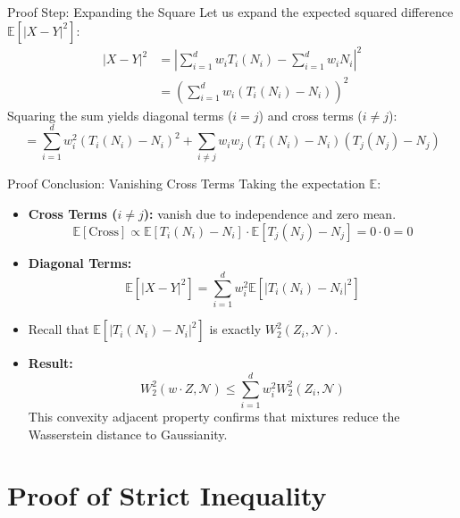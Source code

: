 \documentclass{beamer}
\begin{document}
\begin{frame}{Proof Step: Expanding the Square}
  Let us expand the expected squared difference $\mathbb{E}[|X - Y|^2]$:
  \begin{align*}
    |X - Y|^2 &= \left| \sum_{i=1}^d w_i T_i(N_i) - \sum_{i=1}^d w_i N_i \right|^2 \\
              &= \left( \sum_{i=1}^d w_i (T_i(N_i) - N_i) \right)^2
  \end{align*}
  Squaring the sum yields diagonal terms ($i=j$) and cross terms ($i \neq j$):
  \[
    = \sum_{i=1}^d w_i^2 (T_i(N_i) - N_i)^2 + \sum_{i \neq j} w_i w_j (T_i(N_i) - N_i)(T_j(N_j) - N_j)
  \]
\end{frame}

\begin{frame}{Proof Conclusion: Vanishing Cross Terms}
  Taking the expectation $\mathbb{E}$:
  \begin{itemize}
    \item \textbf{Cross Terms ($i \neq j$):} vanish due to independence and zero mean.
      \[
        \mathbb{E}[\text{Cross}] \propto \mathbb{E}[T_i(N_i) - N_i] \cdot \mathbb{E}[T_j(N_j) - N_j] = 0 \cdot 0 = 0
      \]
    \item \textbf{Diagonal Terms:}
      \[
        \mathbb{E}[|X - Y|^2] = \sum_{i=1}^d w_i^2 \mathbb{E}[ |T_i(N_i) - N_i|^2 ]
      \]
    \item Recall that $\mathbb{E}[ |T_i(N_i) - N_i|^2 ]$ is exactly $W_2^2(Z_i, \mathcal{N})$.
    \item \textbf{Result:}
      \[
        W_2^2(w \cdot Z, \mathcal{N}) \le \sum_{i=1}^d w_i^2 W_2^2(Z_i, \mathcal{N})
      \]
      This convexity adjacent property confirms that mixtures reduce the Wasserstein distance to Gaussianity.
  \end{itemize}
\end{frame}


\section{Proof of Strict Inequality}
\end{document}
